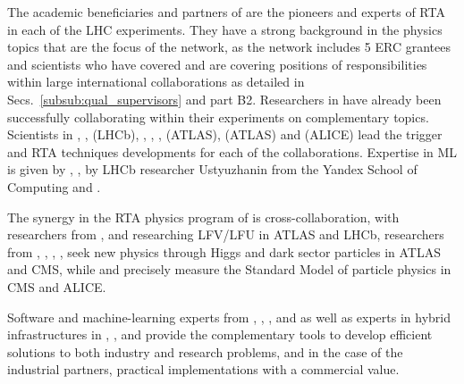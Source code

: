 The academic beneficiaries and partners of \acronym are the pioneers and experts of RTA in each of the LHC experiments. 
They have a strong background in the physics topics that are the focus of the network, as the network includes 5 ERC grantees and scientists who have covered and are covering positions of responsibilities within large international collaborations as detailed in Secs.~\ref{subsub:qual_supervisors} and part B2.
Researchers in \acronym have already been successfully collaborating within their experiments on complementary topics. 
Scientists in \nikhefentity, \cnrsentity, \dortmundentity (LHCb), \oregonentity, \ohioentity, \lundentity, \heidelbergentity (ATLAS), \helsinkientity (ATLAS)  and \lundentity (ALICE) lead the trigger and RTA techniques developments for each of the collaborations. 
Expertise in ML is given by \pointeightentity, \unigeentity, by LHCb researcher Ustyuzhanin from the Yandex School of Computing and \cernentity.  

The synergy in the RTA physics program of \acronym is cross-collaboration, with researchers from \nikhefentity, \cnrsentity and \dortmundentity researching LFV/LFU in ATLAS and LHCb, researchers from \unigeentity, \cernentity, \helsinkientity, \heidelbergentity, \oregonentity seek new physics through Higgs and dark sector particles in ATLAS and CMS, while \lundentity and \helsinkientity precisely measure the Standard Model of particle physics in CMS and ALICE. 

Software and machine-learning experts from \pointeightentity, \ximantisentity, \heidelberginstrumentsentity, \cernentity and \ibmentity as well as experts in hybrid infrastructures in \pisaentity, \cnrsentity, \fleetmaticsentity and \lightboxentity provide the complementary tools to develop efficient solutions to both industry and research problems, and in the case of the industrial partners, practical implementations with a commercial value. 

